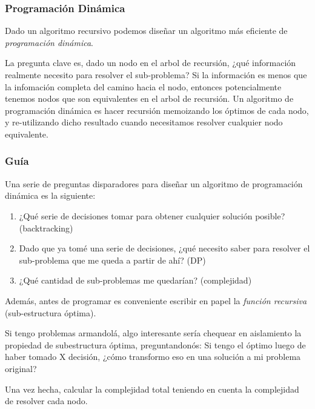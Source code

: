 \subsubsection*{Programación Dinámica}

Dado un algoritmo recursivo podemos diseñar un algoritmo más eficiente de \textit{programación dinámica}.

La pregunta clave es, dado un nodo en el arbol de recursión, ¿qué información realmente necesito para resolver el sub-problema? Si la información es menos que la infomación completa del camino hacia el nodo, entonces potencialmente tenemos nodos que son equivalentes en el arbol de recursión. Un algoritmo de programación dinámica es hacer recursión memoizando los óptimos de cada nodo, y re-utilizando dicho resultado cuando necesitamos resolver cualquier nodo equivalente.

\subsubsection*{Guía}

Una serie de preguntas disparadores para diseñar un algoritmo de programación dinámica es la siguiente:

\begin{enumerate}
    \item ¿Qué serie de decisiones tomar para obtener cualquier solución posible? (backtracking)
    \item Dado que ya tomé una serie de decisiones, ¿qué necesito saber para resolver el sub-problema que me queda a partir de ahí? (DP)
    \item ¿Qué cantidad de sub-problemas me quedarían? (complejidad)
\end{enumerate}

Además, antes de programar es conveniente escribir en papel la \textit{función recursiva} (sub-estructura óptima).

Si tengo problemas armandolá, algo interesante sería chequear en aislamiento la propiedad de subestructura óptima, preguntandonós: Si tengo el óptimo luego de haber tomado X decisión, ¿cómo transformo eso en una solución a mi problema original?

Una vez hecha, calcular la complejidad total teniendo en cuenta la complejidad de resolver cada nodo.
